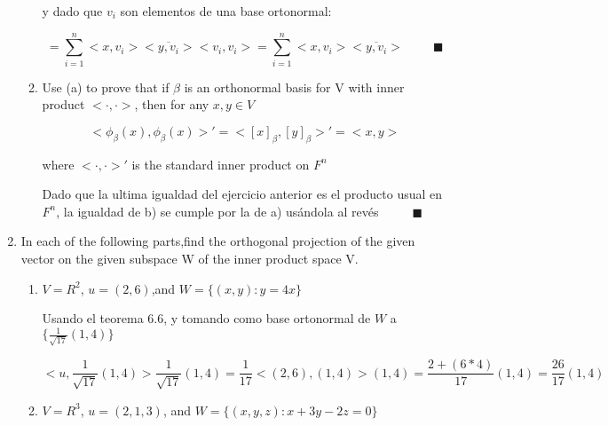 \documentclass[12pt,a4paper]{article}
\begin{document}
\begin{enumerate}
\begin{enumerate}
        y dado que $v_i$ son elementos de una base ortonormal:
        
        \begin{equation*}
            = \sum_{i = 1}^{n} <x, v_i> \overline{<y, v_i>}<v_i,v_i> =  \sum_{i = 1}^{n} <x, v_i> \overline{<y, v_i>} \hspace{1cm} \blacksquare
        \end{equation*}
        
        \item Use (a) to prove that if $\beta$ is an orthonormal basis for V with inner product $<\cdot,\cdot>$, then for any $x,y \in V$
        
        \begin{equation*}
            <\phi_\beta (x), \phi_\beta (x)>' = <[x]_\beta,[y]_\beta>' =<x,y>
        \end{equation*}
        
        where $<\cdot,\cdot>'$ is the standard inner product on $F^n$
        
        Dado que la ultima igualdad del ejercicio anterior es el producto usual en $F^n$, la igualdad de b) se cumple por la de a) usándola al revés $ \hspace{1cm} \blacksquare$
        
        
        
    \end{enumerate}
    
    
    
    
    
    \item   In each of the following parts,find the orthogonal projection of the given vector on the given subspace W of the inner product space V.
    
    \begin{enumerate}
        \item $V = R^2$, $u=(2,6)$,and $W =\{(x,y) : y =4x\}$
        
        Usando el teorema 6.6, y tomando como base ortonormal de $W$ a $\{\frac{1}{\sqrt{17}} (1,4)\}$
        
        \begin{equation*}
            <u,\frac{1}{\sqrt{17}}(1,4)> \frac{1}{\sqrt{17}}(1,4) =\frac{1}{17} <(2,6),(1,4)>(1,4) = \frac{2+(6*4)}{17} (1,4) = \frac{26}{17} (1,4)
        \end{equation*}
        
        \item $V = R^3$, $u=(2,1,3)$, and $W = \{(x,y,z):x+3y-2z = 0\}$
        

\end{enumerate}
\end{enumerate}
\end{document}
